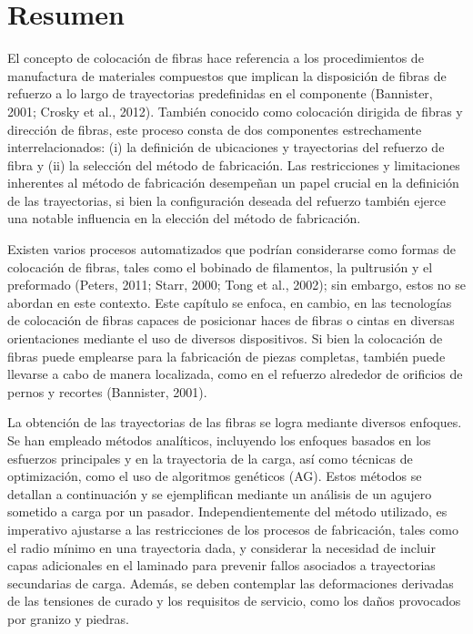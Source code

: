 \setcounter{page}{1}
\chapter*{Resumen}


El concepto de colocación de fibras hace referencia a los procedimientos de manufactura de materiales compuestos que implican la disposición de fibras de refuerzo a lo largo de trayectorias predefinidas en el componente (Bannister, 2001; Crosky et al., 2012). También conocido como colocación dirigida de fibras y dirección de fibras, este proceso consta de dos componentes estrechamente interrelacionados: (i) la definición de ubicaciones y trayectorias del refuerzo de fibra y (ii) la selección del método de fabricación. Las restricciones y limitaciones inherentes al método de fabricación desempeñan un papel crucial en la definición de las trayectorias, si bien la configuración deseada del refuerzo también ejerce una notable influencia en la elección del método de fabricación.

Existen varios procesos automatizados que podrían considerarse como formas de colocación de fibras, tales como el bobinado de filamentos, la pultrusión y el preformado (Peters, 2011; Starr, 2000; Tong et al., 2002); sin embargo, estos no se abordan en este contexto. Este capítulo se enfoca, en cambio, en las tecnologías de colocación de fibras capaces de posicionar haces de fibras o cintas en diversas orientaciones mediante el uso de diversos dispositivos. Si bien la colocación de fibras puede emplearse para la fabricación de piezas completas, también puede llevarse a cabo de manera localizada, como en el refuerzo alrededor de orificios de pernos y recortes (Bannister, 2001).

La obtención de las trayectorias de las fibras se logra mediante diversos enfoques. Se han empleado métodos analíticos, incluyendo los enfoques basados en los esfuerzos principales y en la trayectoria de la carga, así como técnicas de optimización, como el uso de algoritmos genéticos (AG). Estos métodos se detallan a continuación y se ejemplifican mediante un análisis de un agujero sometido a carga por un pasador. Independientemente del método utilizado, es imperativo ajustarse a las restricciones de los procesos de fabricación, tales como el radio mínimo en una trayectoria dada, y considerar la necesidad de incluir capas adicionales en el laminado para prevenir fallos asociados a trayectorias secundarias de carga. Además, se deben contemplar las deformaciones derivadas de las tensiones de curado y los requisitos de servicio, como los daños provocados por granizo y piedras.